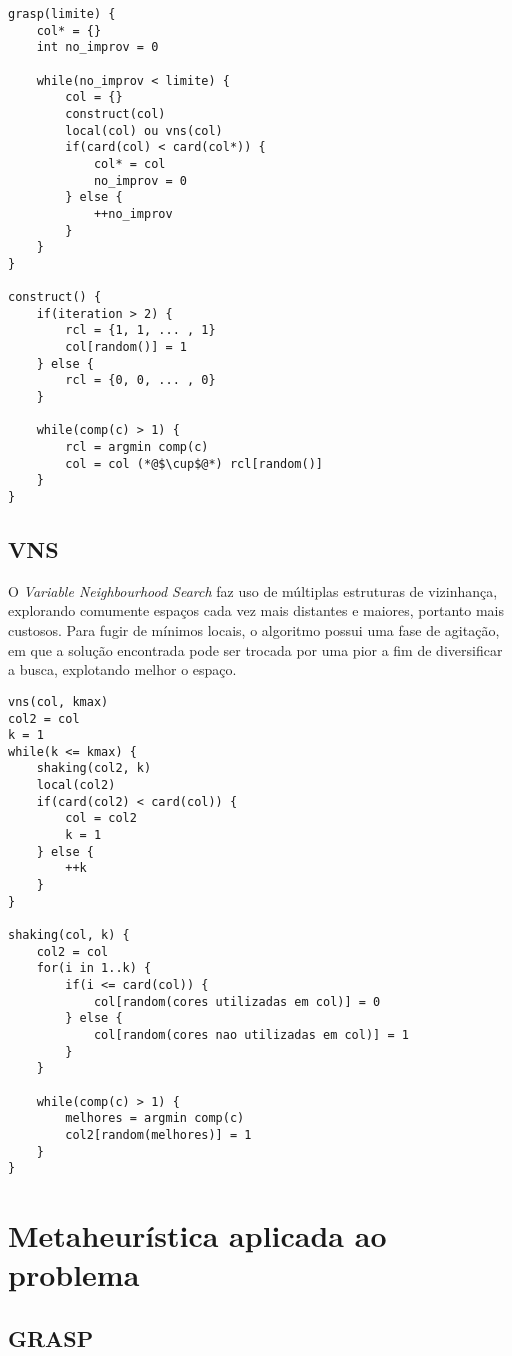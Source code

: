 \documentclass[12pt, a4paper]{article}
\begin{document}
\begin{lstlisting}[caption=Pseudocódigo para GRASP, basicstyle=\ttfamily\scriptsize]
grasp(limite) {
    col* = {}
    int no_improv = 0

    while(no_improv < limite) {
        col = {}
        construct(col)
        local(col) ou vns(col)
        if(card(col) < card(col*)) {
            col* = col
            no_improv = 0
        } else {
            ++no_improv
        }
    }
}

construct() {
    if(iteration > 2) {
        rcl = {1, 1, ... , 1}
        col[random()] = 1
    } else {
        rcl = {0, 0, ... , 0}
    }

    while(comp(c) > 1) {
        rcl = argmin comp(c)
        col = col (*@$\cup$@*) rcl[random()]
    }
}
\end{lstlisting}

\subsection{VNS}
O \emph{Variable Neighbourhood Search} faz uso de múltiplas estruturas de
vizinhança, explorando comumente espaços cada vez mais distantes e maiores,
portanto mais custosos. Para fugir de mínimos locais, o algoritmo possui uma fase
de agitação, em que a solução encontrada pode ser trocada por uma pior a fim de
diversificar a busca, explotando melhor o espaço.

\begin{lstlisting}[caption=Pseudocódigo para VNS, basicstyle=\ttfamily\scriptsize]
vns(col, kmax)
col2 = col
k = 1
while(k <= kmax) {
    shaking(col2, k)
    local(col2)
    if(card(col2) < card(col)) {
        col = col2
        k = 1
    } else {
        ++k
    }
}

shaking(col, k) {
    col2 = col
    for(i in 1..k) {
        if(i <= card(col)) {
            col[random(cores utilizadas em col)] = 0
        } else {
            col[random(cores nao utilizadas em col)] = 1
        }
    }

    while(comp(c) > 1) {
        melhores = argmin comp(c)
        col2[random(melhores)] = 1
    }
}
\end{lstlisting}


\section{Metaheurística aplicada ao problema}
\subsection{GRASP}
\end{document}
